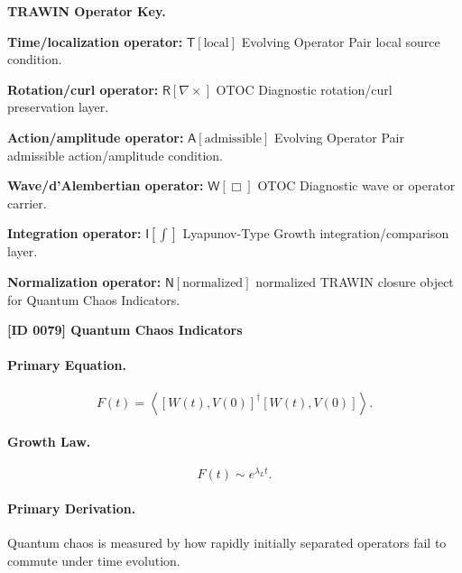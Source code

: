 \par\vspace{0.45\baselineskip}
\noindent\begin{minipage}[t]{\linewidth}
\begingroup
\small
\raggedright
\textbf{TRAWIN Operator Key.}\par
\noindent\textbf{Time/localization operator:} $\mathsf{T}\!\left[\mathrm{local}\right]$ Evolving Operator Pair local source condition.\par
\noindent\textbf{Rotation/curl operator:} $\mathsf{R}\!\left[\nabla\times\right]$ OTOC Diagnostic rotation/curl preservation layer.\par
\noindent\textbf{Action/amplitude operator:} $\mathsf{A}\!\left[\mathrm{admissible}\right]$ Evolving Operator Pair admissible action/amplitude condition.\par
\noindent\textbf{Wave/d'Alembertian operator:} $\mathsf{W}\!\left[\Box\right]$ OTOC Diagnostic wave or operator carrier.\par
\noindent\textbf{Integration operator:} $\mathsf{I}\!\left[\int\right]$ Lyapunov-Type Growth integration/comparison layer.\par
\noindent\textbf{Normalization operator:} $\mathsf{N}\!\left[\mathrm{normalized}\right]$ normalized TRAWIN closure object for Quantum Chaos Indicators.\par
\endgroup
\end{minipage}

\clearpage
\noindent\textbf{[ID 0079] Quantum Chaos Indicators}\par
\vspace{0.35em}
\paragraph{Primary Equation.}
\begin{equation}
F(t)
=
\left\langle
[W(t),V(0)]^\dagger
[W(t),V(0)]
\right\rangle .
\end{equation}

\paragraph{Growth Law.}
\begin{equation}
F(t)\sim e^{\lambda_L t}.
\end{equation}

\paragraph{Primary Derivation.}
Quantum chaos is measured by how rapidly initially separated operators fail to commute under time evolution.

